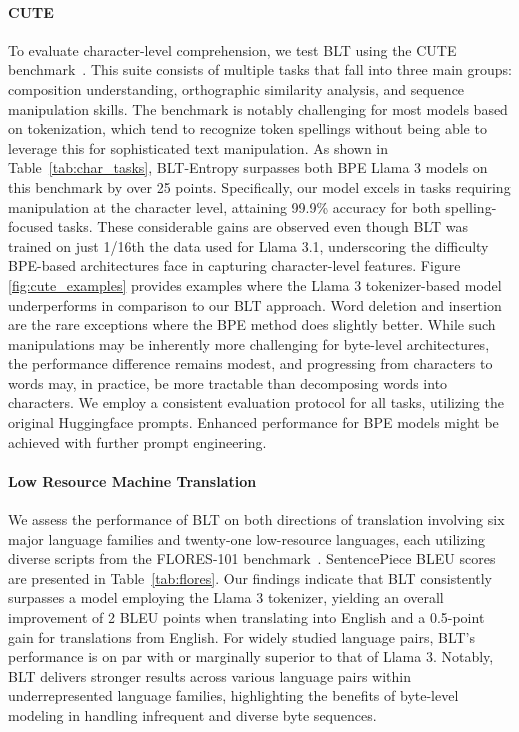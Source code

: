 \paragraph{CUTE}
To evaluate character-level comprehension, we test {\textsc BLT} using the CUTE benchmark~\citep{edman2024cute}. This suite consists of multiple tasks that fall into three main groups: composition understanding, orthographic similarity analysis, and sequence manipulation skills. The benchmark is notably challenging for most models based on tokenization, which tend to recognize token spellings without being able to leverage this for sophisticated text manipulation. As shown in Table~\ref{tab:char_tasks}, {\textsc BLT}-Entropy surpasses both BPE Llama 3 models on this benchmark by over 25 points. Specifically, our model excels in tasks requiring manipulation at the character level, attaining 99.9\% accuracy for both spelling-focused tasks. These considerable gains are observed even though {\textsc BLT} was trained on just 1/16th the data used for Llama 3.1, underscoring the difficulty BPE-based architectures face in capturing character-level features. Figure \ref{fig:cute_examples} provides examples where the Llama 3 tokenizer-based model underperforms in comparison to our {\textsc BLT} approach. Word deletion and insertion are the rare exceptions where the BPE method does slightly better. While such manipulations may be inherently more challenging for byte-level architectures, the performance difference remains modest, and progressing from characters to words may, in practice, be more tractable than decomposing words into characters. We employ a consistent evaluation protocol for all tasks, utilizing the original Huggingface prompts. Enhanced performance for BPE models might be achieved with further prompt engineering.

\paragraph{Low Resource Machine Translation} We assess the performance of {\textsc BLT} on both directions of translation involving six major language families and twenty-one low-resource languages, each utilizing diverse scripts from the FLORES-101 benchmark~\citep{goyal2022flores}. SentencePiece BLEU scores are presented in Table~\ref{tab:flores}. Our findings indicate that {\textsc BLT} consistently surpasses a model employing the Llama 3 tokenizer, yielding an overall improvement of 2 BLEU points when translating into English and a 0.5-point gain for translations from English. For widely studied language pairs, {\textsc BLT}'s performance is on par with or marginally superior to that of Llama 3. Notably, {\textsc BLT} delivers stronger results across various language pairs within underrepresented language families, highlighting the benefits of byte-level modeling in handling infrequent and diverse byte sequences.

